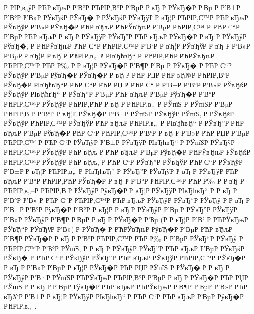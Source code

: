 \documentclass[a4paper,14pt]{extarticle}
\begin{document}
Р  РІР‚в„ўР РЋР вЂљР  Р’В°Р РЋРІР‚В°Р  Р’ВµР  Р вЂ¦Р  РЎвЂ�Р  Р’Вµ Р  Р’В±Р  Р’В°Р  Р’В»Р  РЎвЂќР  РЎвЂ� Р  РЎвЂќР  РЎвЂўР  Р вЂ¦Р РЋРІР‚С™Р РЋР вЂљР  РЎвЂўР  Р’В»Р  РЎвЂ�Р РЋР вЂљР РЋРЎвЂњР  Р’ВµР РЋРІР‚С™ Р РЋР С“Р  Р’ВµР РЋР вЂљР  Р вЂ Р  РЎвЂўР  РЎвЂ”Р РЋР вЂљР  РЎвЂ�Р  Р вЂ Р  РЎвЂўР  РўвЂ�, Р РЋРЎвЂњР РЋР С“Р РЋРІР‚С™Р  Р’В°Р  Р вЂ¦Р  РЎвЂўР  Р вЂ Р  Р’В»Р  Р’ВµР  Р вЂ¦Р  Р вЂ¦Р РЋРІР‚в„–Р  РІвЂћвЂ“ Р РЋРІР‚РЋР РЋРЎвЂњР РЋРІР‚С™Р РЋР Р‰ Р  Р вЂ¦Р  РЎвЂ�Р  Р’В¶Р  Р’Вµ Р  РЎвЂ� Р РЋР С“Р  РЎвЂўР  Р’ВµР  РўвЂ�Р  РЎвЂ�Р  Р вЂ¦Р РЋР РЏР РЋР вЂ№Р РЋРІР‚В°Р  РЎвЂ�Р  РІвЂћвЂ“Р РЋР С“Р РЋР РЏ Р РЋР С“ Р  Р’В±Р  Р’В°Р  Р’В»Р  РЎвЂќР  РЎвЂўР  РІвЂћвЂ“ Р  РЎвЂ”Р  Р’ВµР РЋР вЂљР  Р’ВµР  РўвЂ�Р  Р’В°Р РЋРІР‚С™Р  РЎвЂўР РЋРІР‚РЋР  Р вЂ¦Р РЋРІР‚в„–Р  РЎпїЅ Р  РЎпїЅР  Р’ВµР РЋРІР‚В¦Р  Р’В°Р  Р вЂ¦Р  РЎвЂ�Р  Р’В·Р  РЎпїЅР  РЎвЂўР  РЎпїЅ, Р  РЎвЂќР  РЎвЂўР РЋРІР‚С™Р  РЎвЂўР РЋР вЂљР РЋРІР‚в„–Р  РІвЂћвЂ“ Р  РЎвЂ”Р РЋР вЂљР  Р’ВµР  РўвЂ�Р РЋР С“Р РЋРІР‚С™Р  Р’В°Р  Р вЂ Р  Р’В»Р РЋР РЏР  Р’ВµР РЋРІР‚С™ Р РЋР С“Р  РЎвЂўР  Р’В±Р  РЎвЂўР  РІвЂћвЂ“ Р  РЎпїЅР  РЎвЂўР РЋРІР‚С™Р  РЎвЂўР РЋР вЂљ-Р РЋР вЂљР  Р’ВµР  РўвЂ�Р РЋРЎвЂњР  РЎвЂќР РЋРІР‚С™Р  РЎвЂўР РЋР вЂљ, Р РЋР С“Р  РЎвЂ”Р  РЎвЂўР РЋР С“Р  РЎвЂўР  Р’В±Р  Р вЂ¦Р РЋРІР‚в„–Р  РІвЂћвЂ“ Р  РЎвЂ”Р  РЎвЂўР  Р вЂ Р  РЎвЂўР РЋР вЂљР  Р’В°Р РЋРІР‚РЋР  РЎвЂ�Р  Р вЂ Р  Р’В°Р РЋРІР‚С™Р РЋР Р‰ Р  Р вЂ Р РЋРІР‚в„–Р РЋРІР‚В¦Р  РЎвЂўР  РўвЂ�Р  Р вЂ¦Р  РЎвЂўР  РІвЂћвЂ“ Р  Р вЂ Р  Р’В°Р  Р’В» Р РЋР С“Р РЋРІР‚С™Р РЋР вЂљР  РЎвЂўР  РЎвЂ“Р  РЎвЂў Р  Р вЂ  Р  Р’В·Р  Р’В°Р  РўвЂ�Р  Р’В°Р  Р вЂ¦Р  Р вЂ¦Р  РЎвЂўР  Р’Вµ Р  РЎвЂ”Р  РЎвЂўР  Р’В»Р  РЎвЂўР  Р’В¶Р  Р’ВµР  Р вЂ¦Р  РЎвЂ�Р  Р’Вµ (Р  Р вЂ¦Р  Р’В° Р РЋРЎвЂњР  РЎвЂ“Р  РЎвЂўР  Р’В») Р  РЎвЂ� Р РЋРЎвЂњР  РўвЂ�Р  Р’ВµР РЋР вЂљР  Р’В¶Р  РЎвЂ�Р  Р вЂ Р  Р’В°Р РЋРІР‚С™Р РЋР Р‰ Р  Р’ВµР  РЎвЂ“Р  РЎвЂў Р РЋРІР‚С™Р  Р’В°Р  РЎпїЅ, Р  Р вЂ Р  РЎвЂўР  РЎвЂ”Р РЋР вЂљР  Р’ВµР  РЎвЂќР  РЎвЂ� Р РЋР С“Р  РЎвЂўР  РЎвЂ”Р РЋР вЂљР  РЎвЂўР РЋРІР‚С™Р  РЎвЂ�Р  Р вЂ Р  Р’В»Р  Р’ВµР  Р вЂ¦Р  РЎвЂ�Р РЋР РЏР  РЎпїЅ Р  РЎвЂ� Р  Р вЂ Р  РЎвЂўР  Р’В·Р  РЎпїЅР РЋРЎвЂњР РЋРІР‚В°Р  Р’ВµР  Р вЂ¦Р  РЎвЂ�Р РЋР РЏР  РЎпїЅ Р  Р вЂ¦Р  Р’ВµР  РўвЂ�Р РЋР вЂљР РЋРЎвЂњР  Р’В¶Р  Р’ВµР  Р’В»Р РЋР вЂ№Р  Р’В±Р  Р вЂ¦Р  РЎвЂўР  РІвЂћвЂ“ Р РЋР С“Р РЋР вЂљР  Р’ВµР  РўвЂ�Р РЋРІР‚в„–.
 
\end{document}
